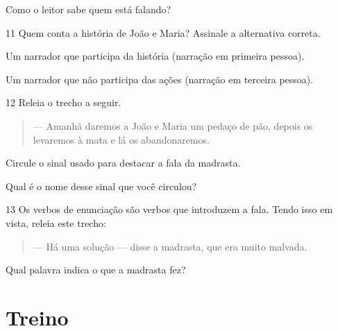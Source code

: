 Como o leitor sabe quem está falando?


\num{11} Quem conta a história de João e Maria? Assinale a alternativa correta.


\begin{boxlist}
 Um narrador que participa da história (narração em primeira pessoa).

 Um narrador que não participa das ações (narração em terceira pessoa).
\end{boxlist}

\num{12} Releia o trecho a seguir.

\begin{quote}
--- Amanhã daremos a João e Maria um pedaço de pão, depois os
levaremos à mata e lá os abandonaremos.
\end{quote}

\begin{escolha}[itemsep=-5pt]
\item Circule o sinal usado para destacar a fala da madrasta.

\item Qual é o nome desse sinal que você circulou?
\item{}
\end{escolha}

\num{13} Os verbos de enunciação são verbos que introduzem a fala. Tendo isso em
vista, releia este trecho:

\begin{quote}
--- Há uma solução --- disse a madrasta, que era muito malvada.
\end{quote}


Qual palavra indica o que a madrasta fez?


\section{Treino}

